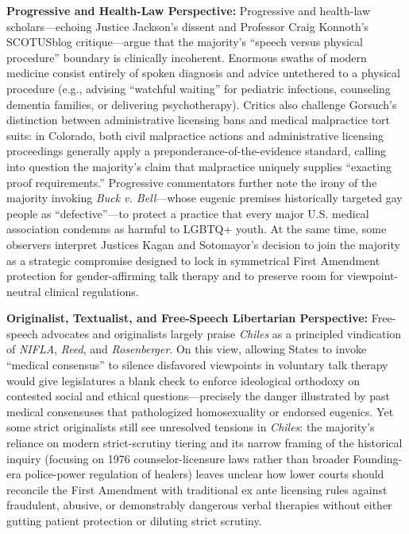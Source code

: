 \documentclass[12pt]{article}
\begin{document}
\textbf{Progressive and Health-Law Perspective:} Progressive and health-law scholars---echoing Justice Jackson's dissent and Professor Craig Konnoth's SCOTUSblog critique---argue that the majority's ``speech versus physical procedure'' boundary is clinically incoherent. Enormous swaths of modern medicine consist entirely of spoken diagnosis and advice untethered to a physical procedure (e.g., advising ``watchful waiting'' for pediatric infections, counseling dementia families, or delivering psychotherapy). Critics also challenge Gorsuch's distinction between administrative licensing bans and medical malpractice tort suits: in Colorado, both civil malpractice actions and administrative licensing proceedings generally apply a preponderance-of-the-evidence standard, calling into question the majority's claim that malpractice uniquely supplies ``exacting proof requirements.'' Progressive commentators further note the irony of the majority invoking \textit{Buck v. Bell}---whose eugenic premises historically targeted gay people as ``defective''---to protect a practice that every major U.S. medical association condemns as harmful to LGBTQ+ youth. At the same time, some observers interpret Justices Kagan and Sotomayor's decision to join the majority as a strategic compromise designed to lock in symmetrical First Amendment protection for gender-affirming talk therapy and to preserve room for viewpoint-neutral clinical regulations.

\textbf{Originalist, Textualist, and Free-Speech Libertarian Perspective:} Free-speech advocates and originalists largely praise \textit{Chiles} as a principled vindication of \textit{NIFLA}, \textit{Reed}, and \textit{Rosenberger}. On this view, allowing States to invoke ``medical consensus'' to silence disfavored viewpoints in voluntary talk therapy would give legislatures a blank check to enforce ideological orthodoxy on contested social and ethical questions---precisely the danger illustrated by past medical consensuses that pathologized homosexuality or endorsed eugenics. Yet some strict originalists still see unresolved tensions in \textit{Chiles}: the majority's reliance on modern strict-scrutiny tiering and its narrow framing of the historical inquiry (focusing on 1976 counselor-licensure laws rather than broader Founding-era police-power regulation of healers) leaves unclear how lower courts should reconcile the First Amendment with traditional ex ante licensing rules against fraudulent, abusive, or demonstrably dangerous verbal therapies without either gutting patient protection or diluting strict scrutiny.
\end{document}
